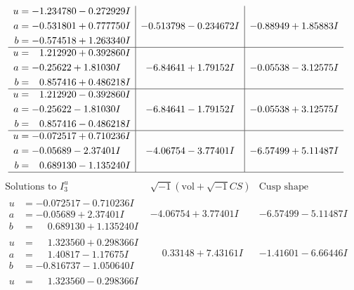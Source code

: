 \documentclass[1p]{elsarticle_modified}
\theoremstyle{definition}
\newcommand{\I}{\sqrt{-1}}
\begin{document}
$$\begin{array}{c|c|c}
\begin{aligned}
u &= -1.234780 - 0.272929 I \\
a &= -0.531801 + 0.777750 I \\
b &= -0.574518 + 1.263340 I\end{aligned}
 & -0.513798 - 0.234672 I & -0.88949 + 1.85883 I \\ \hline\begin{aligned}
u &= \phantom{-}1.212920 + 0.392860 I \\
a &= -0.25622 + 1.81030 I \\
b &= \phantom{-}0.857416 + 0.486218 I\end{aligned}
 & -6.84641 + 1.79152 I & -0.05538 - 3.12575 I \\ \hline\begin{aligned}
u &= \phantom{-}1.212920 - 0.392860 I \\
a &= -0.25622 - 1.81030 I \\
b &= \phantom{-}0.857416 - 0.486218 I\end{aligned}
 & -6.84641 - 1.79152 I & -0.05538 + 3.12575 I \\ \hline\begin{aligned}
u &= -0.072517 + 0.710236 I \\
a &= -0.05689 - 2.37401 I \\
b &= \phantom{-}0.689130 - 1.135240 I\end{aligned}
 & -4.06754 - 3.77401 I & -6.57499 + 5.11487 I\\
 \hline 
 \end{array}$$\newpage$$\begin{array}{c|c|c}  
\text{Solutions to }I^u_{3}& \I (\text{vol} + \sqrt{-1}CS) & \text{Cusp shape}\\
 \hline 
\begin{aligned}
u &= -0.072517 - 0.710236 I \\
a &= -0.05689 + 2.37401 I \\
b &= \phantom{-}0.689130 + 1.135240 I\end{aligned}
 & -4.06754 + 3.77401 I & -6.57499 - 5.11487 I \\ \hline\begin{aligned}
u &= \phantom{-}1.323560 + 0.298366 I \\
a &= \phantom{-}1.40817 - 1.17675 I \\
b &= -0.816737 - 1.050640 I\end{aligned}
 & \phantom{-}0.33148 + 7.43161 I & -1.41601 - 6.66446 I \\ \hline\begin{aligned}
u &= \phantom{-}1.323560 - 0.298366 I \\

\end{aligned}
\end{array}$$
\end{document}
